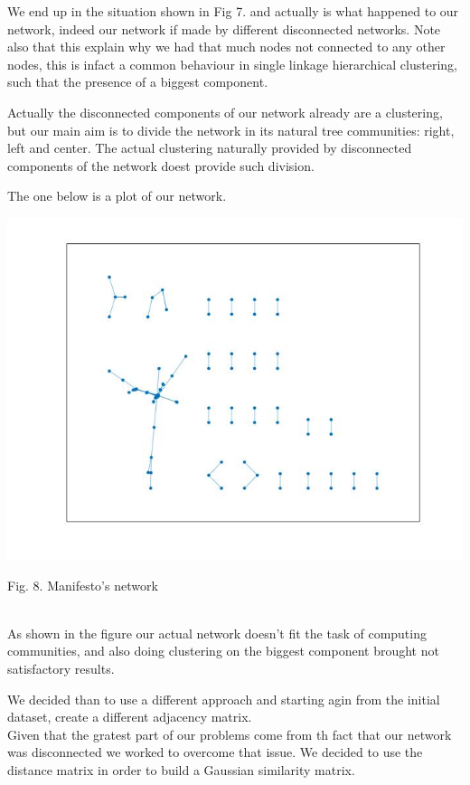 \documentclass{article}%
\begin{document}
We end up in the situation shown in Fig 7. and actually is what happened to our network, indeed our network if made by different disconnected networks. Note also that this explain why we had that much nodes not connected to any other nodes, this is infact a common behaviour in single linkage hierarchical clustering, such that the presence of a biggest component.

Actually the disconnected components of our network already are a clustering, but our main aim is to divide the network in its natural tree communities: right, left and center.
The actual clustering naturally provided by disconnected components of the network doest provide such division.


The one below is a plot of our network.


\includegraphics[scale=0.5]{disc_graph}
\begin{center}
\begin{small}
Fig. 8. Manifesto's network
\end{small}
\end{center}
~
\\

As shown in the figure our actual network doesn't fit the task of computing communities, and also doing clustering on the biggest component brought not satisfactory results.

We decided than to use a different approach and starting agin from the initial dataset, create a different adjacency matrix.
\\

Given that the gratest part of our problems come from th fact that our network was disconnected we worked to overcome that issue. We decided to use the distance matrix in order to build a Gaussian similarity matrix.
\end{document}
